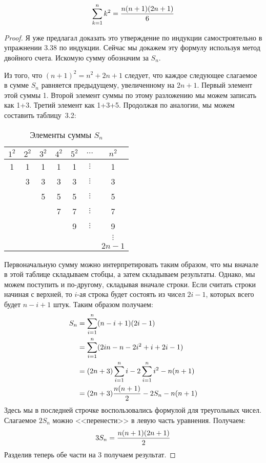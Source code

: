 \begin{thm}
$$\sum_{k=1}^n k^2 = {n(n+1)(2n+1)\over 6}$$
\end{thm}
\begin{proof}
Я уже предлагал доказать это утверждение по индукции самостроятельно в упражнении 3.38 по индукции. Сейчас мы докажем эту формулу используя метод двойного счета. Искомую сумму обозначим за $S_n$.

Из того, что $(n+1)^2 = n^2 + 2n + 1$ следует, что каждое следующее слагаемое в сумме $S_n$ равняется предыдущему, увеличенному на $2n+1$. Первый элемент этой суммы 1. Второй элемент суммы по этому разложению мы можем записать как 1+3. Третий элемент как 1+3+5. Продолжая по аналогии, мы можем составить таблицу~3.2:

\begin{table}[h]
\centering
\begin{tabular}{ccccccc}
$1^2$ & $2^2$ & $3^2$ & $4^2$ & $5^2$ & $\ldots$ & $n^2$ \\
\hline
1 & 1 & 1 & 1 & 1 & $\vdots$ & 1 \\
& 3 & 3 & 3 & 3 & $\vdots$ & 3 \\
& & 5 & 5 & 5 & $\vdots$ & 5 \\
& & & 7 & 7 & $\vdots$ & 7 \\
& & & & 9 & $\vdots$ & 9 \\
& & & & & &  $\vdots$  \\
& & & & & &  $2n-1$  \\
\end{tabular}
\caption{Элементы суммы $S_n$}
\end{table}

Первоначальную сумму можно интерпретировать таким образом, что мы вначале в этой таблице складываем стобцы, а затем складываем результаты. Однако, мы можем поступить и по-другому, складывая вначале строки. Если считать строки начиная с верхней, то $i$-ая строка будет состоять из чисел $2i-1$, которых всего будет $n-i+1$ штук. Таким образом получаем:
\begin{align*}
S_n & = \sum_{i=1}^n (n-i+1)(2i-1)\\
& = \sum_{i=1}^n (2in - n - 2i^2 + i + 2i - 1)  \\
& = (2n+3)\sum_{i=1}^n i - 2\sum_{i=1}^n i^2 - n(n+1) \\
& = (2n+3){n(n+1)\over 2} - 2S_n - n(n+1)
\end{align*}
Здесь мы в последней строчке воспользовались формулой для треугольных чисел. Слагаемое $2S_n$ можно <<перенести>> в левую часть уравнения. Получаем:
\begin{align*}
3S_n = {n(n+1)(2n+1)\over 2}
\end{align*}
Разделив теперь обе части на 3 получаем результат.
\end{proof}

